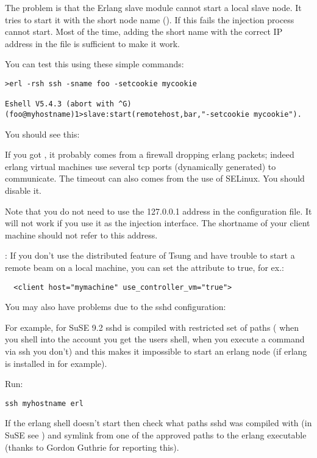 \documentclass{IDXDOC-en}
\begin{document}
\begin{appendix}
The problem is that the Erlang slave module cannot start a local slave
node. It tries to start it with the short node name
 ().
 If this fails the injection process cannot
start. Most of the time, adding the short name with the correct IP
address in the  file is sufficient to make it work.

You can test this using these simple commands:
\begin{Verbatim}
>erl -rsh ssh -sname foo -setcookie mycookie

Eshell V5.4.3 (abort with ^G)
(foo@myhostname)1>slave:start(remotehost,bar,"-setcookie mycookie").
\end{Verbatim}
You should see this: 

If you got , it probably comes from
a firewall dropping erlang packets; indeed erlang virtual machines use
several tcp ports (dynamically generated) to communicate.
The timeout can also comes from the use of SELinux. You should disable it.


Note that you do not need to use the 127.0.0.1 address in the configuration file.
It will not work if you use it as the injection interface. The shortname
of your client machine should not refer to this address.

: If you don't use the distributed feature of
Tsung and have trouble to start a remote beam on a local machine,
you can set the  attribute to true, for ex.:

\begin{Verbatim}
  <client host="mymachine" use_controller_vm="true">
\end{Verbatim}

You may also have problems due to the sshd configuration:

For example, for SuSE 9.2 sshd is compiled with restricted set of
paths (\ie{} when you shell into the account you get the users shell,
when you execute a command via ssh you don't) and this makes it
impossible to start an erlang node (if erlang is installed in
 for example).

Run:

\begin{Verbatim}
ssh myhostname erl
\end{Verbatim}

If the erlang shell doesn't start then check what paths sshd was compiled with
(in SuSE see ) and symlink from one of the approved paths
to the erlang executable (thanks to Gordon Guthrie for reporting this).


\end{appendix}
\end{document}
